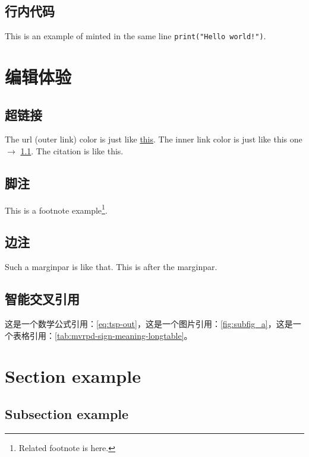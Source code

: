 \documentclass[fontset=none]{ctexart}
\begin{document}
\subsection{行内代码}

This is an example of minted in the same line \texttt{print("Hello world!")}.

\section{编辑体验}

\subsection{超链接}\label{sec:hyperlink}

The url (outer link) color is just like \href{https://chen-huaneng.github.io/}{this}. The inner link color is just like this one $\rightarrow$ \ref{sec:hyperlink}. The citation is like this\cite{2009A}.

\subsection{脚注}

This is a footnote example\footnote{Related footnote is here.}.

\subsection{边注}

Such a marginpar is like that.  This is after the marginpar.

\subsection{智能交叉引用}

这是一个数学公式引用：\autoref{eq:tsp-out}，这是一个图片引用：\autoref{fig:subfig_a}，这是一个表格引用：\autoref{tab:mvrpd-sign-meaning-longtable}。

\section{Section example}

\subsection{Subsection example}
\end{document}
